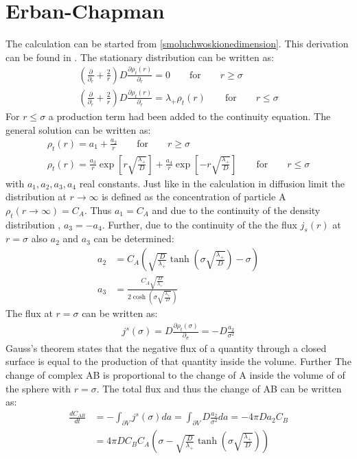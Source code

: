 \documentclass[
  a4paper,BCOR10mm,oneside,
  headsepline,footsepline,%
  fleqn,openbib
]{scrbook}
\begin{document}
\section{Erban-Chapman}\label{Erban-Chapmann}
The calculation can be started from \cref{smoluchwoskionedimension}. This derivation can be found in \cite{Erban2009}. The stationary distribution can be written as:
\begin{align}
\left(\frac{\partial}{\partial_r}+\frac{2}{r} \right) D \frac{\partial\rho_t(r)}{\partial_r}=0 \qquad \text{for} \qquad r \geq \sigma \\
\left(\frac{\partial}{\partial_r}+\frac{2}{r} \right) D \frac{\partial\rho_t(r)}{\partial_r}=\lambda_{+} \rho_t(r)  \qquad \text{for} \qquad r \leq \sigma
\end{align}
For  $r \leq \sigma$ a production term had been added to the continuity equation. The general solution can be written as: 
\begin{align}
\rho_t(r)= a_1+\frac{a_2}{r} \qquad \text{for} \qquad r \geq \sigma \label{erbanchapmanradial1} \\
\rho_t(r)= \frac{a_3}{r} \exp \left[ r \sqrt{\frac{\lambda_{+}}{D}} \right] + \frac{a_4}{r} \exp \left[-r \sqrt{\frac{\lambda_{+}}{D}} \right] \qquad\text{for}\qquad r \leq \sigma \label{erbanchapmanradial}
\end{align}
with $a_1, a_2, a_3, a_4$ real constants. Just like in the calculation in diffusion limit the distribution at  $r \rightarrow \infty$ is defined as the concentration of particle A $\rho_t(r \rightarrow \infty)=C_A$. Thus $a_1=C_A$ and due to the continuity of the density distribution , $a_3=-a_4$. Further, due to the continuity of the the flux $j_s(r)$ at $r=\sigma$ also $a_2$ and $a_3$ can be determined:
\begin{align}
 a_2&= C_A \left( \sqrt{\frac{D}{\lambda_{+}}} \tanh\left(\sigma \sqrt{\frac{\lambda_{+}}{D}}\right)-\sigma\right)  \\
 a_3&= \frac{C_A  \sqrt{\frac{D}{\lambda_{+}}}}{2 \cosh\left(\sigma \sqrt{\frac{\lambda_{+}}{D}}\right)}
\end{align}
The flux at  $r= \sigma$ can be written as:
\begin{align}
j^{s}(\sigma)=D \frac{\partial\rho_t(\sigma)}{\partial_{\sigma}}= -D \frac{a_2}{\sigma^2} 
\end{align}
Gauss's theorem states that the negative flux of a quantity through a closed surface is equal to the production of that quantity inside the volume. Further The change of complex AB is proportional to the change of A inside the volume of of the sphere with $r=\sigma$. The total flux and thus the change of AB can be written as:
\begin{align}
  \frac{d C_{AB} }{dt}&=- \int_{\partial V} j^{s}(\sigma) da= \int_{\partial V} D \frac{a_2} {\sigma^2}  da =- 4 \pi D a_2 C_B \\ &= 4 \pi D C_B  C_A \left(\sigma -\sqrt{\frac{D}{\lambda_{+}}} \tanh\left(\sigma \sqrt{\frac{\lambda_{+}}{D}}\right)\right)
\end{align}
\end{document}
